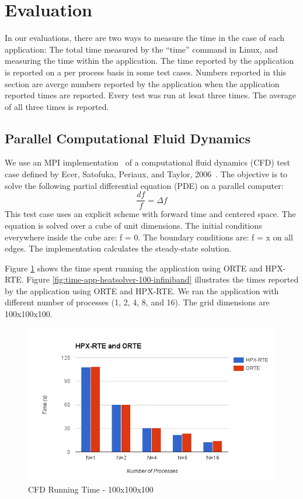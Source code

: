 \section{Evaluation}
In our evaluations, there are two ways to measure the time in the case of each application: The total time measured by the ``time'' command in Linux, and measuring the time within the application. The time reported by the application is reported on a per process basis in some test cases. Numbers reported in this section are averge numbers reported by the application when the application reported times are reported. Every test was run at lesat three times. The average of all three times is reported.


\subsection{Parallel Computational Fluid Dynamics}
We use an MPI implementation~\cite{resch1999comparison} of a computational fluid dynamics (CFD) test case defined by Ecer, Satofuka, Periaux, and Taylor, 2006~\cite{ecer1996parallel}.
The objective is to solve the following partial differential equation (PDE) on a parallel computer:
\[
\frac{df}{f} = \Delta f
\]
This test case uses an explicit scheme with forward time and centered space. The equation is solved over a cube of unit dimensions. The initial conditions everywhere inside the cube are: f = 0. The boundary conditions are: f = x on all edges. The implementation calculates the steady-state solution.

Figure \ref{fig:time-all-heatsolver-100-infiniband} shows the time spent running the application using ORTE and HPX-RTE. Figure \ref{fig:time-app-heatsolver-100-infiniband} illustrates the times reported by the application using ORTE and HPX-RTE. We ran the application with different number of processes (1, 2, 4, 8, and 16). The grid dimensions are 100x100x100.

\begin{figure}[h!]
  \centering
  \includegraphics[scale=0.7]{images/time-all-heatsolver-100-infiniband.png}
  \caption[CFD Running Time - 100x100x100]{CFD Running Time - 100x100x100}
  \label{fig:time-all-heatsolver-100-infiniband}
\end{figure}

